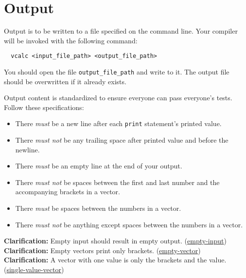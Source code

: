 \documentclass{article}
\newcommand{\code}[1]{\texttt{\textmd{#1}}}
\newcommand{\clarification}[2]{\textbf{Clarification: }#1 (\hyperlink{#2}{#2})}
\begin{document}
\section{Output}
Output is to be written to a file specified on the command line. Your compiler
will be invoked with the following command:
\begin{lstlisting}
  vcalc <input_file_path> <output_file_path>
\end{lstlisting}
You should open the file \code{output\_file\_path} and write to it. The output file should be
overwritten if it already exists.

Output content is standardized to ensure everyone can pass everyone's tests. Follow these
specifications:
\begin{itemize}
  \item
    There \textit{must} be a new line after each \code{print} statement's printed value.
  \item
    There \textit{must not} be any trailing space after printed value and before the newline.
  \item
    There \textit{must} be an empty line at the end of your output.
  \item
    There \textit{must not} be spaces between the first and last number and the accompanying
    brackets in a vector.
  \item
    There \textit{must} be spaces between the numbers in a vector.
  \item
    There \textit{must not} be anything except spaces between the numbers in a vector.
\end{itemize}

\clarification{Empty input should result in empty output.}{empty-input}\\
\clarification{Empty vectors print only brackets.}{empty-vector}\\
\clarification{A vector with one value is only the brackets and the value.}{single-value-vector}
\end{document}
